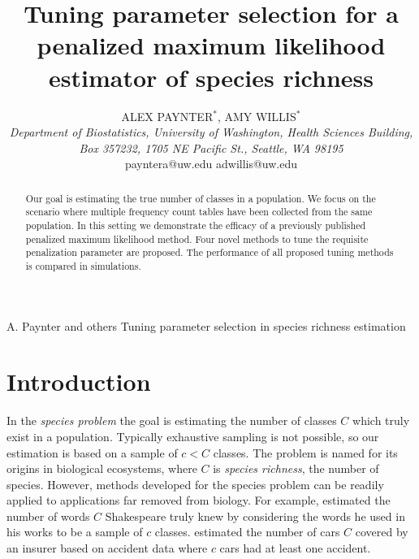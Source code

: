 \documentclass[oupdraft]{bio}
\begin{document}
\title{Tuning parameter selection for a penalized maximum likelihood estimator of species richness}

\author{ALEX PAYNTER$^\ast$, AMY WILLIS$^\ast$\\[4pt]
\textit{Department of Biostatistics,
University of Washington,
Health Sciences Building, Box 357232,
1705 NE Pacific St., Seattle, WA 98195}
\\[2pt]
{payntera@uw.edu adwillis@uw.edu}}

\markboth%
{A. Paynter and others}
{Tuning parameter selection in species richness estimation}

\maketitle


\begin{abstract}
{Our goal is estimating the true number of classes in a population.   We focus on the scenario where multiple frequency count tables have been collected from the same population.  In this setting we demonstrate the efficacy of a previously published penalized maximum likelihood method.  Four novel methods to tune the requisite penalization parameter are proposed.  The performance of all proposed tuning methods is compared in simulations.}
\end{abstract}


\section{Introduction}
\label{sec:introduction}

In the \textit{species problem} the goal is estimating the number of classes $C$ which truly exist in a population.  Typically exhaustive sampling is not possible, so our estimation is based on a sample of $c < C$ classes.  The problem is named for its origins in biological ecosystems, where $C$ is \textit{species richness}, the number of species.  However, methods developed for the species problem can be readily applied to applications far removed from biology.  For example, \citet{efron_1976} estimated the number of words $C$ Shakespeare truly knew by considering the words he used in his works to be a sample of $c$ classes.  \citet{fegatelli_2018} estimated the number of cars $C$ covered by an insurer based on accident data where $c$ cars had at least one accident. 
\end{document}
